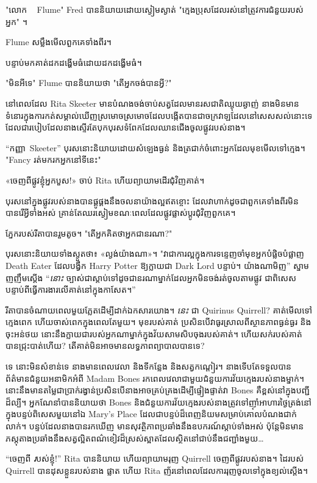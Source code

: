 {"លោក ~ Flume" Fred បាននិយាយដោយស្ងៀមស្ងាត់ "ក្មេងប្រុសដែលរស់នៅត្រូវការជំនួយរបស់អ្នក" ។

Flume សម្លឹងមើលពួកគេទាំងពីរ។

បន្ទាប់មកគាត់ដកដង្ហើមធំដោយដកដង្ហើមធំ។

"មិនអីទេ" Flume បាននិយាយថា "តើអ្នកចង់បានអ្វី?"


នៅពេលដែល Rita Skeeter មានបំណងចង់ចាប់សត្វដែលមានរសជាតិឈ្ងុយឆ្ងាញ់ នាងមិនមានទំនោរក្នុងការកត់សម្គាល់ឃើញស្រមោចស្រមោចដែលបង្កើតបានជាចក្រវាឡដែលនៅសេសសល់នោះទេ ដែលជារបៀបដែលនាងស្ទើរតែបុកបុរសទំពែកដែលឈានជើងចូលផ្លូវរបស់នាង។

“កញ្ញា~Skeeter” បុរសនោះនិយាយដោយសំឡេងធ្ងន់ និងត្រជាក់ចំពោះអ្នកដែលមុខមើលទៅក្មេង។ "Fancy រត់មករកអ្នកនៅទីនេះ"

«ចេញ​ពី​ផ្លូវ​ខ្ញុំ​អ្នក​បួស!» ចាប់ Rita ហើយព្យាយាមដើរជុំវិញគាត់។

បុរសនៅក្នុងផ្លូវរបស់នាងបានផ្គូផ្គងនឹងចលនាយ៉ាងល្អឥតខ្ចោះ ដែលវាហាក់ដូចជាពួកគេទាំងពីរមិនបានរើអ្វីទាំងអស់ គ្រាន់តែឈរស្ងៀមខណៈពេលដែលផ្លូវផ្លាស់ប្តូរជុំវិញពួកគេ។

ភ្នែករបស់រីតាបានរួមតូច។ "តើអ្នកគិតថាអ្នកជានរណា?"

បុរស​នោះ​និយាយ​ទាំង​ស្ងួត​ថា​៖ «​ល្ងង់​យ៉ាង​ណា​»។ "វាជាការល្អក្នុងការទន្ទេញចាំមុខអ្នកបំផ្លិចបំផ្លាញ Death Eater ដែលបង្វឹក Harry Potter ឱ្យក្លាយជា Dark Lord បន្ទាប់។ យ៉ាងណាមិញ” ស្នាមញញឹមស្តើង “\emph{នោះ} ច្បាស់ជាស្តាប់ទៅដូចជានរណាម្នាក់ដែលអ្នកមិនចង់រត់ចូលតាមផ្លូវ ជាពិសេសបន្ទាប់ពីធ្វើការងារលើគាត់នៅក្នុងកាសែត។”

រីតាបានចំណាយពេលមួយភ្លែតដើម្បីដាក់ឯកសារយោង។ \emph{នេះ} ជា Quirinus Quirrell? គាត់មើលទៅក្មេងពេក ហើយចាស់ពេកក្នុងពេលតែមួយ។ មុខរបស់គាត់ ប្រសិនបើវាធូរស្រាលពីស្ថានភាពធ្ងន់ធ្ងរ និងចុះអន់ថយ នោះនឹងក្លាយជារបស់អ្នកណាម្នាក់ក្នុងវ័យសាមសិបចុងរបស់គាត់។ ហើយ​សក់​របស់​គាត់​បាន​ជ្រុះ​បាត់​ហើយ? តើគាត់មិនអាចមានលទ្ធភាពព្យាបាលបានទេ?

ទេ នោះមិនសំខាន់ទេ នាងមានពេលវេលា និងទីកន្លែង និងសត្វកណ្តៀរ។ នាងទើបតែទទួលបានព័ត៌មានជំនួយអនាមិកអំពី Madam Bones រកពេលវេលាជាមួយជំនួយការវ័យក្មេងរបស់នាងម្នាក់។ នោះនឹងមានតម្លៃជាប្រាក់រង្វាន់ប្រសិនបើនាងអាចគ្រប់គ្រងដើម្បីផ្ទៀងផ្ទាត់វា Bones គឺខ្ពស់នៅក្នុងបញ្ជីដ៏ល្បី។ អ្នកណែនាំបាននិយាយថា Bones និងជំនួយការវ័យក្មេងរបស់នាងត្រូវទៅញ៉ាំអាហារថ្ងៃត្រង់នៅក្នុងបន្ទប់ពិសេសមួយនៅឯ Mary's Place ដែលជាបន្ទប់ដ៏ពេញនិយមសម្រាប់គោលបំណងជាក់លាក់។ បន្ទប់ដែលនាងបានរកឃើញ មានសុវត្ថិភាពប្រឆាំងនឹងឧបករណ៍ស្តាប់ទាំងអស់ ប៉ុន្តែមិនមានភស្តុតាងប្រឆាំងនឹងសត្វល្អិតពណ៌ខៀវដ៏ស្រស់ស្អាតដែលស្ថិតនៅជាប់នឹងជញ្ជាំងមួយ…

“ចេញពី \emph របស់ខ្ញុំ!” Rita បាននិយាយ ហើយព្យាយាមរុញ Quirrell ចេញពីផ្លូវរបស់នាង។ ដៃរបស់ Quirrell បានដុសខ្លួនរបស់នាង ផ្លាត ហើយ Rita ញ័រនៅពេលដែលការរុញចូលទៅក្នុងខ្យល់ស្តើង។

}

